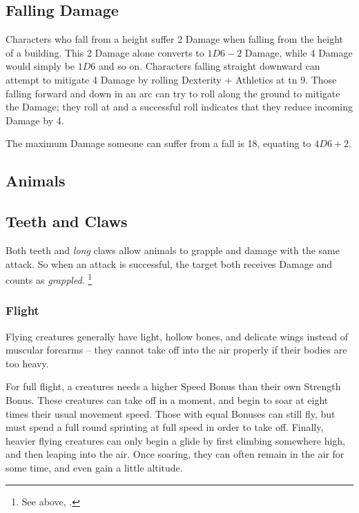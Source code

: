 \begin{multicols}{2}

\subsection{Falling Damage}

Characters who fall from a height suffer 2 Damage when falling from the height of a building.
This 2 Damage alone converts to $1D6-2$ Damage, while 4 Damage would simply be $1D6$ and so on.
Characters falling straight downward can attempt to mitigate 4 Damage by rolling Dexterity + Athletics at \gls{tn} 9.
Those falling forward and down in an arc can try to roll along the ground to mitigate the Damage; they roll  at \tn[7] and a successful roll indicates that they reduce incoming Damage by 4.

The maximum Damage someone can suffer from a fall is 18, equating to $4D6+2$.

\subsection{Animals}

\subsection{Teeth and Claws}
\label{teeth}
\label{claws}

Both teeth and \emph{long} claws allow animals to grapple and damage with the same attack.
So when an attack is successful, the target both receives Damage and counts as \textit{grappled}.%
\footnote{See above, .}

\subsubsection{Flight}

Flying creatures generally have light, hollow bones, and delicate wings instead of muscular forearms -- they cannot take off into the air properly if their bodies are too heavy.

For full flight, a creatures needs a higher Speed Bonus than their own Strength Bonus.
These creatures can take off in a moment, and begin to soar at eight times their usual movement speed.
Those with equal Bonuses can still fly, but must spend a full round sprinting at full speed in order to take off.
Finally, heavier flying creatures can only begin a glide by first climbing somewhere high, and then leaping into the air.
Once soaring, they can often remain in the air for some time, and even gain a little altitude.


\end{multicols}
